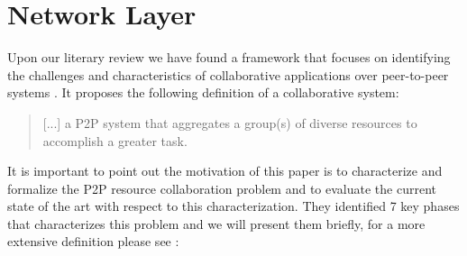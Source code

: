 \documentclass[11pt]{amsart}
\begin{document}
	\section{Network Layer}
        Upon our literary review we have found a framework that
        focuses on identifying the challenges and characteristics of
        collaborative applications over peer-to-peer systems
        \cite{p2p_collab}. It proposes the following definition of a
        collaborative system:
        \begin{quote}
          [...] a P2P system that aggregates a group(s) of diverse resources to
          accomplish a greater task.
        \end{quote}
        It is important to point out the motivation of this paper is to
        characterize and formalize the P2P resource collaboration problem and to
        evaluate the current state of the art with respect to this
        characterization. They identified 7 key phases that characterizes this
        problem and we will present them briefly, for a more extensive
        definition please see \cite{p2p_collab}:
\end{document}
